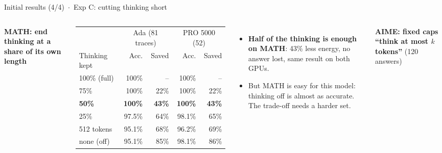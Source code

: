 \documentclass[aspectratio=169,9pt]{beamer}
\newcommand{\hd}[1]{{\color{accent}\bfseries #1}}
\begin{document}
\begin{frame}{Initial results (4/4) \,$\cdot$\, Exp C: cutting thinking short}
  \begin{columns}[T,onlytextwidth]
    \hd{MATH: end thinking at a share of its own length}\\[2pt]
    \scriptsize
    \begin{tabular}{@{}lrrrr@{}}
      \toprule
      & \multicolumn{2}{c}{Ada (81 traces)} & \multicolumn{2}{c}{PRO 5000 (52)} \\
      Thinking kept & Acc. & Saved & Acc. & Saved \\
      \midrule
      100\% (full) & 100\% & -- & 100\% & -- \\
      75\% & 100\% & 22\% & 100\% & 22\% \\
      \textbf{50\%} & \textbf{100\%} & \textbf{43\%} & \textbf{100\%} & \textbf{43\%} \\
      25\% & 97.5\% & 64\% & 98.1\% & 65\% \\
      512 tokens & 95.1\% & 68\% & 96.2\% & 69\% \\
      none (off) & 95.1\% & 85\% & 98.1\% & 86\% \\
      \bottomrule
    \end{tabular}
    \begin{itemize}\scriptsize
      \item \textbf{Half of the thinking is enough on MATH}: 43\% less energy, no answer lost, same result on both GPUs.
      \item But MATH is easy for this model: thinking off is almost as accurate. The trade-off needs a harder set.
    \end{itemize}
    \hd{AIME: fixed caps ``think at most $k$ tokens''} {\scriptsize\color{muted}(120 answers)}\\[1pt]
    \centering
\end{columns}
\end{frame}
\end{document}
